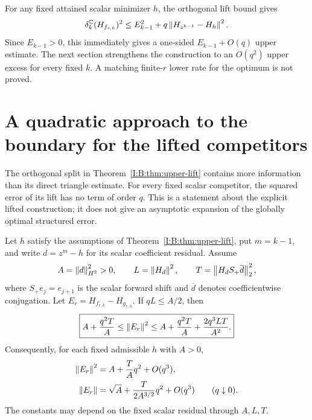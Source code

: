 For any fixed attained scalar minimizer $h$, the orthogonal lift bound gives
\[
\delta_k^{\mathbb C}(H_{f_{r,k}})^2
\le E_{k-1}^2+q\left\lVert H_{z^{k-1}}-H_h\right\rVert^2.
\]
Since $E_{k-1}>0$, this immediately gives a one-sided $E_{k-1}+O(q)$ upper estimate. The next section strengthens the construction to an $O(q^2)$ upper excess for every fixed $k$. A matching finite-$r$ lower rate for the optimum is not proved.

\section{A quadratic approach to the boundary for the lifted competitors}
\label{I:B:sec:curvature}

The orthogonal split in Theorem~\ref{I:B:thm:upper-lift} contains more
information than its direct triangle estimate. For every fixed scalar
competitor, the squared error of its lift has no term of order $q$.
This is a statement about the explicit lifted construction; it does not
give an asymptotic expansion of the globally optimal structured error.

\begin{proposition}
\label{I:B:prop:lift-curvature}
Let $h$ satisfy the assumptions of Theorem~\ref{I:B:thm:upper-lift}, put
$m=k-1$, and write $d=z^m-h$ for its scalar coefficient residual.
Assume
\begin{equation}
 A=\left\lVert d\right\rVert_{H^2}^2>0,\qquad
 L=\left\lVert H_d\right\rVert^2,\qquad
 T=\left\lVert H_dS_+\overline d\right\rVert_2^2,
 \label{I:B:eq:curvature-parameters}
\end{equation}
where $S_+e_j=e_{j+1}$ is the scalar forward shift and
$\overline d$ denotes coefficientwise conjugation. Let
$E_r=H_{f_{r,k}}-H_{g_{r,h}}$. If $qL\le A/2$, then
\begin{equation}
 \boxed{\displaystyle
 A+\frac{q^2T}{A}
 \le\left\lVert E_r\right\rVert^2
 \le A+\frac{q^2T}{A}+\frac{2q^3LT}{A^2}.}
 \label{I:B:eq:curvature-finite-bound}
\end{equation}
Consequently, for each fixed admissible $h$ with $A>0$,
\begin{align}
 \left\lVert E_r\right\rVert^2&=A+\frac{T}{A}q^2+O(q^3),
 \label{I:B:eq:curvature-squared-expansion}\\
 \left\lVert E_r\right\rVert&=\sqrt A+\frac{T}{2A^{3/2}}q^2+O(q^3)
 \qquad(q\downarrow0).
 \label{I:B:eq:curvature-norm-expansion}
\end{align}
The constants may depend on the fixed scalar residual through $A,L,T$.
\end{proposition}

